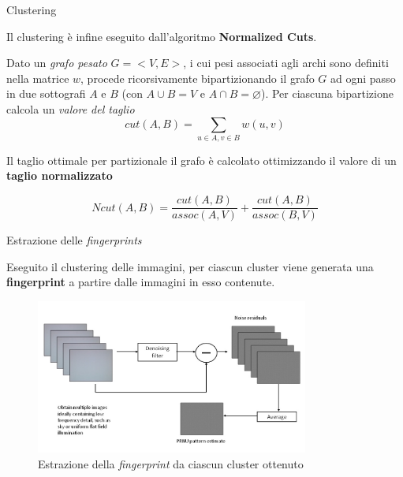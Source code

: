 \begin{tframe}{Clustering}

Il clustering è infine eseguito dall'algoritmo \textbf{Normalized Cuts}.
\vspace{0.3cm}

Dato un \emph{grafo pesato} $G = <V, E>$, i cui pesi associati agli archi sono definiti nella matrice $w$, procede ricorsivamente bipartizionando il grafo $G$ ad ogni passo in due sottografi $A$ e $B$ (con $A \cup B = V$ e $A \cap B = \varnothing$). Per ciascuna bipartizione calcola un \emph{valore del taglio
}
$$
cut(A, B) = \sum_{u \in A, v \in B} w(u, v)
$$

Il taglio ottimale per partizionale il grafo è calcolato ottimizzando il valore di un \textbf{taglio normalizzato}

$$Ncut(A, B) = \frac{cut(A, B)}{assoc(A, V)} + \frac{cut(A, B)}{assoc(B, V)}$$

\end{tframe}



\begin{tframe}{Estrazione delle \emph{fingerprints}}

Eseguito il clustering delle immagini, per ciascun cluster viene generata una \textbf{fingerprint} a partire dalle immagini in esso contenute.

\begin{figure}[h]
\begin{center}
\includegraphics[width=0.8\textwidth]{../images/prnu_extraction_2}
\end{center}
  \caption{Estrazione della \emph{fingerprint} da ciascun cluster ottenuto}
\label{fig:soglia AC}
\end{figure}
\end{tframe}